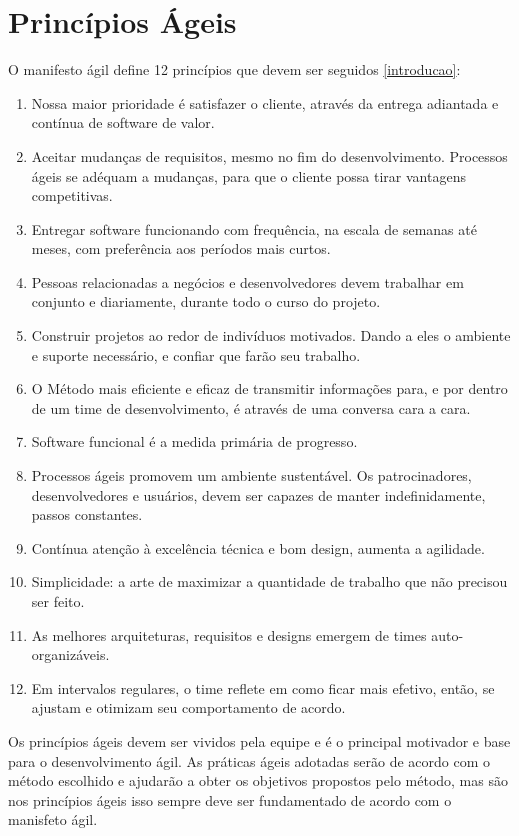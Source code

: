 \section{Princípios Ágeis}
\label{principios-ageis}
O manifesto ágil define 12 princípios que devem ser seguidos \ref{introducao}:
%
\begin{enumerate}
\item Nossa maior prioridade é satisfazer o cliente, através da entrega adiantada e contínua de software de valor.
\item Aceitar mudanças de requisitos, mesmo no fim do desenvolvimento. Processos ágeis se adéquam a mudanças, para que o cliente possa tirar vantagens competitivas.
\item Entregar software funcionando com frequência, na escala de semanas até meses, com preferência aos períodos mais curtos.
\item Pessoas relacionadas a negócios e desenvolvedores devem trabalhar em conjunto e diariamente, durante todo o curso do projeto.
\item Construir projetos ao redor de indivíduos motivados. Dando a eles o ambiente e suporte necessário, e confiar que farão seu trabalho.
\item O Método mais eficiente e eficaz de transmitir informações para, e por dentro de um time de desenvolvimento, é através de uma conversa cara a cara.
\item Software funcional é a medida primária de progresso.
\item Processos ágeis promovem um ambiente sustentável. Os patrocinadores, desenvolvedores e usuários, devem ser capazes de manter indefinidamente, passos constantes.
\item Contínua atenção à excelência técnica e bom design, aumenta a agilidade.
\item Simplicidade: a arte de maximizar a quantidade de trabalho que não precisou ser feito.
\item As melhores arquiteturas, requisitos e designs emergem de times auto-organizáveis.
\item Em intervalos regulares, o time reflete em como ficar mais efetivo, então, se ajustam e otimizam seu comportamento de acordo.
\end{enumerate}

Os princípios ágeis devem ser vividos pela equipe e é o principal motivador e base para o desenvolvimento ágil. As práticas ágeis adotadas serão de acordo com o método escolhido e ajudarão a obter os objetivos propostos pelo método, mas são nos princípios ágeis isso sempre deve ser fundamentado de acordo com o manisfeto ágil.